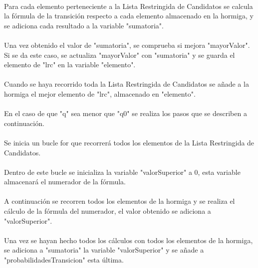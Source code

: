 	\paragraph{}Para cada elemento perteneciente a la Lista Restringida de Candidatos se calcula la fórmula de la transición respecto a cada elemento almacenado en la hormiga, y se adiciona cada resultado a la variable "sumatoria".
	
	\paragraph{}Una vez obtenido el valor de "sumatoria", se comprueba si mejora "mayorValor". Si se da este caso, se actualiza "mayorValor" con "sumatoria" y se guarda el elemento de "lrc" en la variable "elemento".
	
	\paragraph{}Cuando se haya recorrido toda la Lista Restringida de Candidatos se añade a la hormiga el mejor elemento de "lrc", almacenado en "elemento".
	
	\paragraph{}En el caso de que "q" sea menor que "q0" se realiza los pasos que se describen a continuación.
	
	\paragraph{}Se inicia un bucle for que recorrerá todos los elementos de la Lista Restringida de Candidatos.
	
	\paragraph{}Dentro de este bucle se inicializa la variable "valorSuperior" a 0, esta variable almacenará el numerador de la fórmula.
	
	\paragraph{}A continuación se recorren todos los elementos de la hormiga y se realiza el cálculo de la fórmula del numerador, el valor obtenido se adiciona a "valorSuperior".
	
	\paragraph{}Una vez se hayan hecho todos los cálculos con todos los elementos de la hormiga, se adiciona a "sumatoria" la variable "valorSuperior" y se añade a "probabilidadesTransicion" esta última.
	
